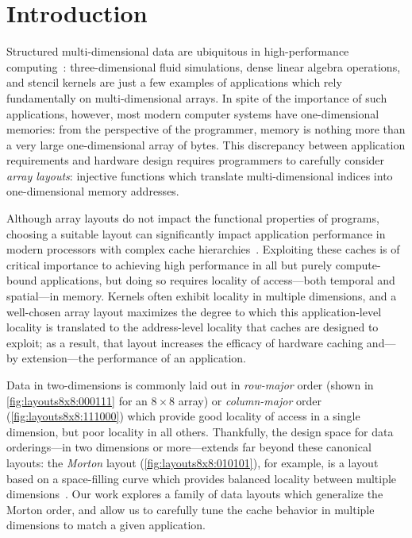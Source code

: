 \section{Introduction}

Structured multi-dimensional data are ubiquitous in high-per\-for\-mance computing~\cite{10.1145/1562764.1562783}: three-dimensional fluid simulations, dense linear algebra operations, and stencil kernels are just a few examples of applications which rely fundamentally on multi-dimensional arrays. In spite of the importance of such applications, however, most modern computer systems have one-dimensional memories: from the perspective of the programmer, memory is nothing more than a very large one-dimensional array of bytes. This discrepancy between application requirements and hardware design requires programmers to carefully consider \emph{array layouts}: injective functions which translate multi-dimensional indices into one-dimensional memory addresses.

Although array layouts do not impact the functional properties of programs, choosing a suitable layout can significantly impact application performance in modern processors with complex cache hierarchies~\cite{1214317}. Exploiting these caches is of critical importance to achieving high performance in all but purely compute-bound applications, but doing so requires locality of access---both temporal and spatial---in memory. Kernels often exhibit locality in multiple dimensions, and a well-chosen array layout maximizes the degree to which this application-level locality is translated to the address-level locality that caches are designed to exploit; as a result, that layout increases the efficacy of hardware caching and---by extension---the performance of an application.

Data in two-dimensions is commonly laid out in \emph{row-major} order (shown in \cref{fig:layouts8x8:000111} for an $8 \times 8$ array) or \emph{column-major} order (\cref{fig:layouts8x8:111000}) which provide good locality of access in a single dimension, but poor locality in all others. Thankfully, the design space for data orderings---in two dimensions or more---extends far beyond these canonical layouts: the \emph{Morton} layout (\cref{fig:layouts8x8:010101}), for example, is a layout based on a space-filling curve which provides balanced locality between multiple dimensions~\cite{morton1966computer,10.1002/cpe.1018}. Our work explores a family of data layouts which generalize the Morton order, and allow us to carefully tune the cache behavior in multiple dimensions to match a given application.


